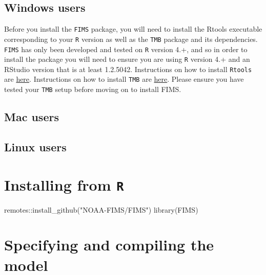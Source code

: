 \documentclass[
]{book}
\newenvironment{Shaded}{\begin{snugshade}}{\end{snugshade}}
\newcommand{\FunctionTok}[1]{\textcolor[rgb]{0.00,0.00,0.00}{#1}}
\newcommand{\NormalTok}[1]{#1}
\newcommand{\SpecialCharTok}[1]{\textcolor[rgb]{0.00,0.00,0.00}{#1}}
\newcommand{\StringTok}[1]{\textcolor[rgb]{0.31,0.60,0.02}{#1}}
\begin{document}
\hypertarget{windows-users}{%
\subsection{Windows users}\label{windows-users}}

Before you install the \texttt{FIMS} package, you will need to install the Rtools executable corresponding to your \texttt{R} version as well as the \texttt{TMB} package and its dependencies. \texttt{FIMS} has only been developed and tested on \texttt{R} version 4.+, and so in order to install the package you will need to ensure you are using \texttt{R} version 4.+ and an RStudio version that is at least 1.2.5042. Instructions on how to install \texttt{Rtools} are \href{https://cran.r-project.org/bin/windows/Rtools/rtools40.html}{here}. Instructions on how to install \texttt{TMB} are \href{https://github.com/kaskr/adcomp/wiki/Download}{here}. Please ensure you have tested your \texttt{TMB} setup before moving on to install FIMS.

\hypertarget{mac-users}{%
\subsection{Mac users}\label{mac-users}}

\hypertarget{linux-users}{%
\subsection{Linux users}\label{linux-users}}

\hypertarget{installing-from-r}{%
\section{\texorpdfstring{Installing from \texttt{R}}{Installing from R}}\label{installing-from-r}}

\begin{Shaded}
\begin{Highlighting}[]
\NormalTok{remotes}\SpecialCharTok{::}\FunctionTok{install\_github}\NormalTok{(}\StringTok{"NOAA{-}FIMS/FIMS"}\NormalTok{)}
\FunctionTok{library}\NormalTok{(FIMS)}
\end{Highlighting}
\end{Shaded}

\hypertarget{specifying-and-compiling-the-model}{%
\section{Specifying and compiling the model}\label{specifying-and-compiling-the-model}}
\end{document}

